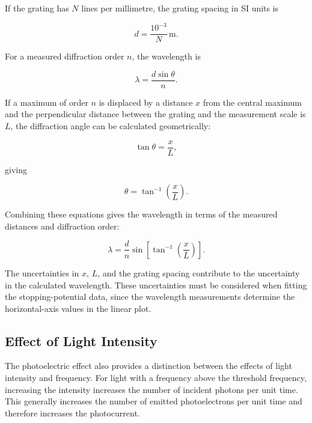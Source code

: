 \documentclass[12pt,a4paper]{article}
\begin{document}
If the grating has \(N\) lines per millimetre, the grating spacing in SI units is

\begin{equation}
    d = \frac{10^{-3}}{N}\,\mathrm{m}.
    \label{eq:grating_spacing}
\end{equation}

For a measured diffraction order \(n\), the wavelength is

\begin{equation}
    \lambda = \frac{d\sin\theta}{n}.
    \label{eq:wavelength}
\end{equation}

If a maximum of order \(n\) is displaced by a distance \(x\) from the central maximum and the perpendicular distance between the grating and the measurement scale is \(L\), the diffraction angle can be calculated geometrically:

\begin{equation}
    \tan\theta = \frac{x}{L},
\end{equation}

giving

\begin{equation}
    \theta = \tan^{-1}\left(\frac{x}{L}\right).
    \label{eq:angle}
\end{equation}

Combining these equations gives the wavelength in terms of the measured distances and diffraction order:

\begin{equation}
    \lambda =
    \frac{d}{n}\sin\left[\tan^{-1}\left(\frac{x}{L}\right)\right].
    \label{eq:measured_wavelength}
\end{equation}

The uncertainties in \(x\), \(L\), and the grating spacing contribute to the uncertainty in the calculated wavelength. These uncertainties must be considered when fitting the stopping-potential data, since the wavelength measurements determine the horizontal-axis values in the linear plot.

\subsection{Effect of Light Intensity}

The photoelectric effect also provides a distinction between the effects of light intensity and frequency. For light with a frequency above the threshold frequency, increasing the intensity increases the number of incident photons per unit time. This generally increases the number of emitted photoelectrons per unit time and therefore increases the photocurrent.
\end{document}
